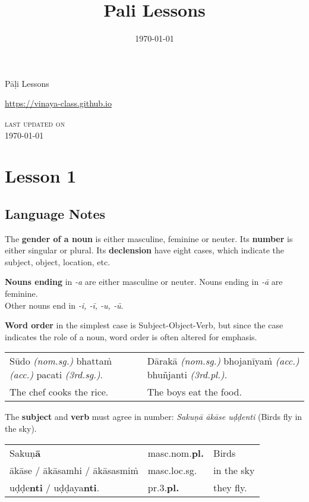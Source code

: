 \documentclass[11pt,oneside]{memoir}
\date{\today}
\title{Pali Lessons}
\begin{document}
\maketitle
\frontmatter

{\centering

{\Huge Pāḷi Lessons}

\bigskip
\href{https://vinaya-class.github.io}{https://vinaya-class.github.io}

{\scshape\small last updated on}\\
\today

}

\bigskip
\tableofcontents*

\mainmatter

\chapter{Lesson 1}
\label{sec:org3d71b9b}
\section{Language Notes}
\label{sec:org6dab479}

The \textbf{gender of a noun} is either masculine, feminine or neuter.
Its \textbf{number} is either singular or plural.
Its \textbf{declension} have eight cases, which indicate the subject, object, location, etc.

\textbf{Nouns ending} in \emph{-a} are either masculine or neuter. Nouns ending in \emph{-ā} are feminine.\\[0pt]
Other nouns end in \emph{-i, -ī, -u, -ū}.

\textbf{Word order} in the simplest case is Subject-Object-Verb, but since the case indicates the role of a noun, word order is often altered for emphasis.

\begin{center}
\begin{tabular}{ll}
Sūdo \emph{(nom.sg.)} bhattaṁ \emph{(acc.)} pacati \emph{(3rd.sg.)}. & Dārakā \emph{(nom.sg.)} bhojanīyaṁ \emph{(acc.)} bhuñjanti \emph{(3rd.pl.)}.\\[0pt]
The chef cooks the rice. & The boys eat the food.\\[0pt]
\end{tabular}
\end{center}

The \textbf{subject} and \textbf{verb} must agree in number: \emph{Sakuṇā ākāse uḍḍenti} (Birds fly in the sky).

\begin{center}
\begin{tabular}{lll}
Sakuṇ\textbf{ā} & masc.nom.\textbf{pl.} & Birds\\[0pt]
ākāse / ākāsamhi / ākāsasmiṁ & masc.loc.sg. & in the sky\\[0pt]
uḍḍe\textbf{nti} / uḍḍaya\textbf{nti}. & pr.3.\textbf{pl.} & they fly.\\[0pt]
\end{tabular}
\end{center}
\end{document}
